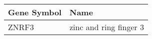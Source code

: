 \begin{tabular}{ll}
\toprule
Gene Symbol &                   Name \\
\midrule
      ZNRF3 & zinc and ring finger 3 \\
\bottomrule
\end{tabular}
